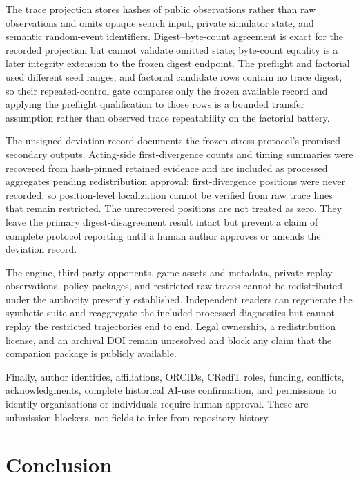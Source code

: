\documentclass[aps,reprint,superscriptaddress,longbibliography,floatfix]{revtex4-2}
\begin{document}
The trace projection stores hashes of public observations rather than raw
observations and omits opaque search input, private simulator state, and
semantic random-event identifiers.  Digest--byte-count agreement is exact for
the recorded projection but cannot validate omitted state; byte-count equality
is a later integrity extension to the frozen digest endpoint.  The preflight
and factorial used different seed ranges, and factorial candidate rows contain
no trace digest, so their repeated-control gate compares only the frozen
available record and applying the preflight qualification to those rows is a
bounded transfer assumption rather than observed trace repeatability on the
factorial battery.

The unsigned deviation record documents the frozen stress protocol's promised
secondary outputs.  Acting-side first-divergence counts and timing summaries
were recovered from hash-pinned retained evidence and are included as processed
aggregates pending redistribution approval; first-divergence positions were
never recorded, so position-level localization cannot be verified from raw
trace lines that remain restricted.  The unrecovered positions are not treated
as zero.  They leave the primary digest-disagreement result intact but prevent
a claim of complete protocol reporting until a human author approves or amends
the deviation record.

The engine, third-party opponents, game assets and metadata, private replay
observations, policy packages, and restricted raw traces cannot be
redistributed under the authority presently established.  Independent readers
can regenerate the synthetic suite and reaggregate the included processed
diagnostics but cannot replay the restricted trajectories end to end.  Legal
ownership, a redistribution license, and an archival DOI remain unresolved and
block any claim that the companion package is publicly available.

Finally, author identities, affiliations, ORCIDs, CRediT roles, funding,
conflicts, acknowledgments, complete historical AI-use confirmation, and
permissions to identify organizations or individuals require human approval.
These are submission blockers, not fields to infer from repository history.

\section{Conclusion}
\end{document}
